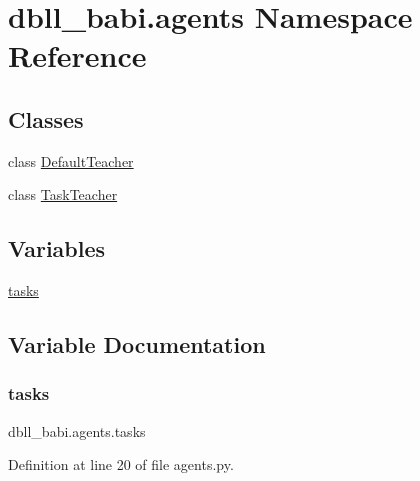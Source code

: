 \hypertarget{namespacedbll__babi_1_1agents}{}\section{dbll\+\_\+babi.\+agents Namespace Reference}
\label{namespacedbll__babi_1_1agents}
\subsection*{Classes}
\begin{DoxyCompactItemize}
\item 
class \hyperlink{classdbll__babi_1_1agents_1_1DefaultTeacher}{Default\+Teacher}
\item 
class \hyperlink{classdbll__babi_1_1agents_1_1TaskTeacher}{Task\+Teacher}
\end{DoxyCompactItemize}
\subsection*{Variables}
\begin{DoxyCompactItemize}
\item 
\hyperlink{namespacedbll__babi_1_1agents_aedd4e48385330ad877fdd245b0043600}{tasks}
\end{DoxyCompactItemize}


\subsection{Variable Documentation}
\mbox{\label{namespacedbll__babi_1_1agents_aedd4e48385330ad877fdd245b0043600}} 
\subsubsection{\texorpdfstring{tasks}{tasks}}
{\footnotesize\ttfamily dbll\+\_\+babi.\+agents.\+tasks}



Definition at line 20 of file agents.\+py.

